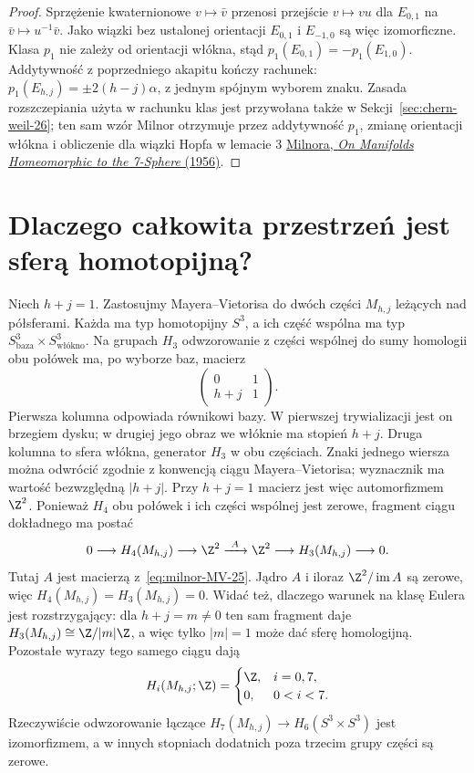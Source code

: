 \begin{proof}
Sprzężenie kwaternionowe $v\mapsto\bar v$
przenosi przejście $v\mapsto vu$ dla
$E_{0,1}$ na $\bar v\mapsto u^{-1}\bar v$.
Jako wiązki bez ustalonej orientacji
$E_{0,1}$ i $E_{-1,0}$ są więc izomorficzne.
Klasa $p_1$ nie zależy od orientacji włókna,
stąd $p_1(E_{0,1})=-p_1(E_{1,0})$.
Addytywność z poprzedniego akapitu kończy
rachunek: $p_1(E_{h,j})=\pm2(h-j)\alpha$,
z jednym spójnym wyborem znaku.
Zasada rozszczepiania użyta w rachunku
klas jest przywołana także w
Sekcji~\ref{sec:chern-weil-26};
ten sam wzór Milnor otrzymuje przez
addytywność $p_1$, zmianę orientacji
włókna i obliczenie dla wiązki Hopfa
w lemacie 3
\href{https://sites.math.rutgers.edu/~feehan/teaching/math866/milnor7sphere.pdf}
{Milnora, \emph{On Manifolds Homeomorphic to
the 7-Sphere} (1956)}.
\end{proof}

\section{Dlaczego całkowita przestrzeń jest
sferą homotopijną?}
\label{sec:milnor-homotopy-25}

Niech $h+j=1$. Zastosujmy
Mayera--Vietorisa do dwóch części
$M_{h,j}$ leżących nad półsferami.
Każda ma typ homotopijny $S^3$,
a ich część wspólna ma typ
$S^3_{\text{baza}}\times
S^3_{\text{włókno}}$.
Na grupach $H_3$ odwzorowanie z części
wspólnej do sumy homologii
obu połówek ma, po wyborze baz,
macierz
\begin{equation}\label{eq:milnor-MV-25}
 \begin{pmatrix}
 0&1\\
 h+j&1
 \end{pmatrix}.
\end{equation}
Pierwsza kolumna odpowiada
równikowi bazy. W pierwszej
trywializacji jest on brzegiem
dysku; w drugiej jego obraz
we włóknie ma stopień $h+j$.
Druga kolumna to sfera włókna,
generator $H_3$ w obu częściach.
Znaki jednego wiersza można
odwrócić zgodnie z konwencją
ciągu Mayera--Vietorisa;
wyznacznik ma wartość
bezwzględną $|h+j|$.
Przy $h+j=1$ macierz jest więc
automorfizmem $\Z^2$. Ponieważ
$H_4$ obu połówek i ich części
wspólnej jest zerowe, fragment
ciągu dokładnego ma postać
\[
 0\longrightarrow H_4(M_{h,j})
 \longrightarrow\Z^2
 \xrightarrow{\ A\ }
 \Z^2\longrightarrow H_3(M_{h,j})
 \longrightarrow0.
\]
Tutaj $A$ jest macierzą z~\eqref{eq:milnor-MV-25}.
Jądro $A$ i iloraz $\Z^2/\operatorname{im}A$
są zerowe,
więc $H_4(M_{h,j})=H_3(M_{h,j})=0$.
Widać też, dlaczego warunek na klasę
Eulera jest rozstrzygający: dla
$h+j=m\ne0$ ten sam fragment daje
$H_3(M_{h,j})\cong\Z/|m|\Z$,
a więc tylko $|m|=1$ może dać
sferę homologijną.
Pozostałe wyrazy tego samego
ciągu dają
\[
 H_i(M_{h,j};\Z)=
 \begin{cases}
 \Z,&i=0,7,\\
 0,&0<i<7.
 \end{cases}
\]
Rzeczywiście odwzorowanie łączące
$H_7(M_{h,j})\to H_6(S^3\times S^3)$
jest izomorfizmem, a w innych
stopniach dodatnich poza trzecim
grupy części są zerowe.

